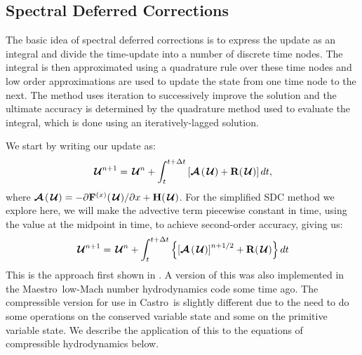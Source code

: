 \documentclass[times,modern]{aastex63}
\newcommand{\castro}{{\sf Castro}}
\newcommand{\maestro}{{\sf Maestro}}
\newcommand{\Uc}{{\,\bm{\mathcal{U}}}}
\newcommand{\Fb}{\mathbf{F}}
\newcommand{\xv}{{(x)}}
\newcommand{\Hb}{{\bf H}}
\newcommand{\Rb}{{\bf R}}
\newcommand{\Adv}[1]{{\left [\boldsymbol{\mathcal{A}} \left(#1\right)\right]}}
\newcommand{\Advs}[1]{\boldsymbol{\mathcal{A}} \left(#1\right)}
\begin{document}
\subsection{Spectral Deferred Corrections}

The basic idea of spectral deferred corrections is to express the
update as an integral and divide the time-update into a number of
discrete time nodes.  The integral is then approximated using a
quadrature rule over these time nodes and low order approximations are
used to update the state from one time node to the next.  The method
uses iteration to successively improve the solution and the ultimate
accuracy is determined by the quadrature method used to evaluate the
integral, which is done using an iteratively-lagged solution.

We start by writing our update as:
\begin{equation}
\Uc^{n+1} = \Uc^n + \int_t^{t+\Delta t} \left [ \Advs{\Uc} + \Rb(\Uc) \right ] dt,
\end{equation}
where $\Advs{\Uc} =  -{\partial \Fb^\xv (\Uc)}/{\partial x} + \Hb(\Uc)$.
For the simplified SDC method we explore here, we will make the
advective term piecewise constant in time, using the value at the
midpoint in time, to achieve second-order accuracy, giving us:
\begin{equation}
\label{eq:integral:simplesdc}
\Uc^{n+1} = \Uc^n + \int_t^{t+\Delta t} \left \{ \Adv{\Uc}^{n+1/2} + \Rb(\Uc) \right \} dt
\end{equation}
This is the approach first shown in \citep{SDC-old}.  A
version of this was also implemented in the \maestro\ low-Mach number
hydrodynamics code some time ago.  The compressible version for use in
\castro\ is slightly different due to the need to do some operations
on the conserved variable state and some on the primitive variable
state.  We describe the application of this to the equations of
compressible hydrodynamics below.
\end{document}
